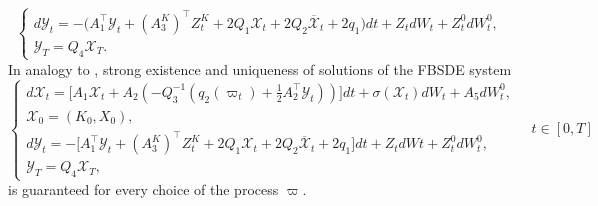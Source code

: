 \documentclass[10pt,a4paper]{amsart}
\numberwithin{equation}{section}
\newcommand{\w}{\varpi}
\renewcommand{\bar}{\overline}
\begin{document}
\begin{equation} 
\label{eqn: mf adjoint process}
\begin{cases}
d\mathcal{Y}_t = -\big( A_1^\top \mathcal{Y}_t + (A^K_3)^\top Z^{K}_t + 2Q_1\mathcal{X}_t + 2Q_2 \bar{\mathcal{X}}_t + 2q_1 \big)dt + Z_t dW_t + Z^{0}_t dW^0_t ,\\
\mathcal{Y}_T = Q_4\mathcal{X}_T.
\end{cases}
\end{equation} 
In analogy to \cite[Proposition 4.2]{del2024mean}, strong existence and uniqueness of solutions of the FBSDE system
\begin{equation}
\label{eqn: mf FBSDE company}
\begin{cases}
d\mathcal{X}_t = \Big[A_1\mathcal{X}_t + A_2(-Q_3^{-1} (q_2(\w_t)+\frac{1}{2}A_2^\top \mathcal{Y}_t))\big]dt + \sigma(\mathcal{X}_t)dW_t + A_5dW^0_t,\\
\mathcal{X}_0=( K_0,X_0),\\
d\mathcal{Y}_t = -\Big[ A_1^\top \mathcal{Y}_t + (A^K_3)^\top Z^{K}_t + 2Q_1\mathcal{X}_t + 2Q_2 \bar{\mathcal{X}}_t + 2q_1 \Big]dt + Z_t dWt + Z^{0}_t dW^0_t ,\\
\mathcal{Y}_T = Q_4\mathcal{X}_T,
\end{cases}\quad t\in[0,T]
\end{equation} 
is guaranteed for every choice of the process $\w$. 
\end{document}
